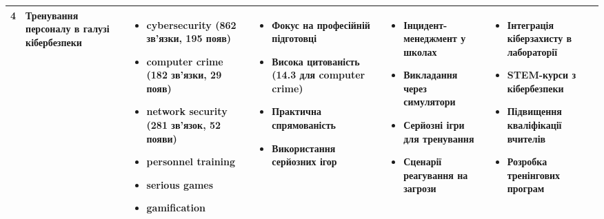{\begin{longtable}{|c|p{2.6cm}|p{3cm}|p{3.1cm}|p{3cm}|p{3cm}|}
\cellcolor{yellow!20}4 & 
\textbf{Тренування персоналу в галузі кібербезпеки} & 
\begin{itemize}
    \item cybersecurity (862 зв'язки, 195 появ)
    \item computer crime (182 зв'язки, 29 появ)
    \item network security (281 зв'язок, 52 появи)
    \item personnel training
    \item serious games
    \item gamification
\end{itemize} & 
\begin{itemize}
    \item Фокус на професійній підготовці
    \item Висока цитованість (14.3 для computer crime)
    \item Практична спрямованість
    \item Використання серйозних ігор
\end{itemize} & 
\begin{itemize}
    \item Інцидент-менеджмент у школах
    \item Викладання через симулятори
    \item Серйозні ігри для тренування
    \item Сценарії реагування на загрози
\end{itemize} & 
\begin{itemize}
    \item Інтеграція кіберзахисту в лабораторії
    \item STEM-курси з кібербезпеки
    \item Підвищення кваліфікації вчителів
    \item Розробка тренінгових програм
\end{itemize} \\
\hline


\end{longtable}}
